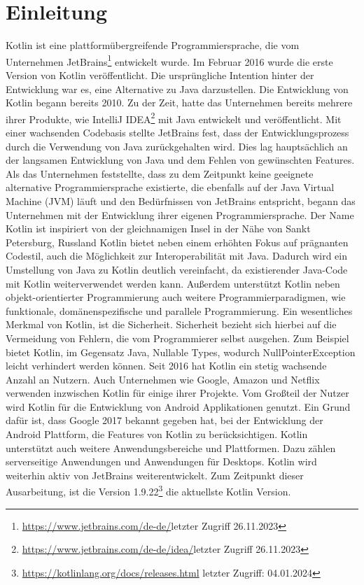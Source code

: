 \documentclass{article}
\begin{document}
\section{Einleitung}
Kotlin ist eine plattformübergreifende Programmiersprache, die vom Unternehmen JetBrains\footnote{\url{https://www.jetbrains.com/de-de/}letzter Zugriff 26.11.2023} entwickelt wurde. Im Februar 2016 wurde die erste Version von Kotlin veröffentlicht. Die ursprüngliche Intention hinter der Entwicklung war es, eine Alternative zu Java darzustellen. Die Entwicklung von Kotlin begann bereits 2010. Zu der Zeit, hatte das Unternehmen bereits mehrere ihrer Produkte, wie IntelliJ IDEA\footnote{\url{https://www.jetbrains.com/de-de/idea/}letzter Zugriff 26.11.2023} mit Java entwickelt und veröffentlicht. Mit einer wachsenden Codebasis stellte JetBrains fest, dass der Entwicklungsprozess durch die Verwendung von Java zurückgehalten wird. Dies lag hauptsächlich an der langsamen Entwicklung von Java und dem Fehlen von gewünschten Features. Als das Unternehmen feststellte, dass zu dem Zeitpunkt keine geeignete alternative Programmiersprache existierte, die ebenfalls auf der Java Virtual Machine (JVM) läuft und den Bedürfnissen von JetBrains entspricht, begann das Unternehmen mit der Entwicklung ihrer eigenen Programmiersprache. Der Name Kotlin ist inspiriert von der gleichnamigen Insel in der Nähe von Sankt Petersburg, Russland\cite{Kotlin_In-D} \newline
Kotlin bietet neben einem erhöhten Fokus auf prägnanten Codestil, auch die Möglichkeit zur Interoperabilität mit Java. Dadurch wird ein Umstellung von Java zu Kotlin deutlich vereinfacht, da existierender Java-Code mit Kotlin weiterverwendet werden kann. Außerdem unterstützt Kotlin neben objekt-orientierter Programmierung auch weitere Programmierparadigmen, wie funktionale, domänenspezifische und parallele Programmierung. Ein wesentliches Merkmal von Kotlin, ist die Sicherheit. Sicherheit bezieht sich hierbei auf die Vermeidung von Fehlern, die vom Programmierer selbst ausgehen. Zum Beispiel bietet Kotlin, im Gegensatz Java, Nullable Types, wodurch NullPointerException leicht verhindert werden können. Seit 2016 hat Kotlin ein stetig wachsende Anzahl an Nutzern. Auch Unternehmen wie Google, Amazon und Netflix verwenden inzwischen Kotlin für einige ihrer Projekte. Vom Großteil der Nutzer wird Kotlin für die Entwicklung von Android Applikationen genutzt. Ein Grund dafür ist, dass Google 2017 bekannt gegeben hat, bei der Entwicklung der Android Plattform, die Features von Kotlin zu berücksichtigen. Kotlin unterstützt auch weitere Anwendungsbereiche und Plattformen. Dazu zählen serverseitige Anwendungen und Anwendungen für Desktops. Kotlin wird weiterhin aktiv von JetBrains weiterentwickelt. Zum Zeitpunkt dieser Ausarbeitung, ist die Version 1.9.22\footnote{\url{https://kotlinlang.org/docs/releases.html} letzter Zugriff: 04.01.2024} die aktuellste Kotlin Version. \cite{Kotlin_In-D}
\end{document}
